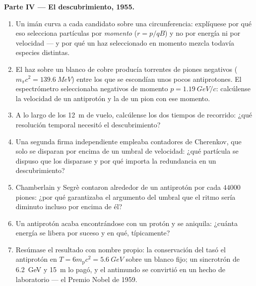 \begin{problem}
\medskip\noindent\textbf{Parte IV --- El descubrimiento, 1955.}
\begin{enumerate}[resume]
  \item Un imán curva a cada candidato sobre una circunferencia: explíquese
        por qué eso selecciona partículas por \emph{momento} ($r = p/qB$)
        y no por energía ni por velocidad --- y por qué un haz
        seleccionado en momento mezcla todavía especies distintas.
  \item El haz sobre un blanco de cobre producía torrentes de piones
        negativos ($m_\pi c^2 = \qty{139.6}{MeV}$) entre los que se
        escondían unos pocos antiprotones. El espectrómetro seleccionaba
        negativos de momento $p = \qty{1.19}{GeV}/c$: calcúlense la velocidad
        de un antiprotón y la de un pion con ese momento.
  \item A lo largo de los \qty{12}{m} de vuelo, calcúlense los dos tiempos de
        recorrido: ¿qué resolución temporal necesitó el descubrimiento?
  \item Una segunda firma independiente empleaba contadores de Cherenkov,
        que solo se disparan por encima de un umbral de velocidad: ¿qué
        partícula se dispuso que los disparase y por qué importa la
        redundancia en un descubrimiento?
  \item Chamberlain y Segrè contaron alrededor de un antiprotón por cada
        $\num{44000}$ piones: ¿por qué garantizaba el argumento del umbral
        que el ritmo sería diminuto incluso por encima de él?
  \item Un antiprotón acaba encontrándose con un protón y se aniquila:
        ¿cuánta energía se libera por suceso y en qué, típicamente?
  \item Resúmase el resultado con nombre propio: la conservación del
         tasó el antiprotón en $T = 6m_{\text{p}}c^2 =
        \qty{5.6}{GeV}$ sobre un blanco fijo; un sincrotrón de
        \qty{6.2}{GeV} y \qty{15}{m} lo pagó, y el antimundo se convirtió
        en un hecho de laboratorio --- el Premio Nobel de 1959.
\end{enumerate}
\end{problem}
